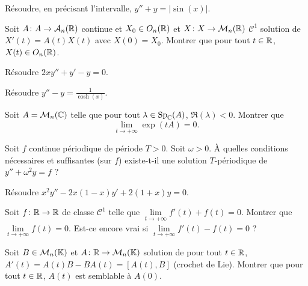 \documentclass[12pt]{article}
\begin{document}
\begin{exercise}
	Résoudre, en précisant l'intervalle, $y''+y=\left\lvert\sin(x)\right\rvert$.
\end{exercise}

\begin{exercise}
	Soit $A\colon A\to\mathcal{A}_n(\mathbb{R})$ continue et $X_0\in O_n(\mathbb{R})$ et $X\colon X\to\mathcal{M}_n(\mathbb{R})$ $\mathcal{C}^{1}$ solution de $X'(t)=A(t)X(t)$ avec $X(0)=X_0$. Montrer que pour tout $t\in\mathbb{R}$, $X(t)\in O_n(\mathbb{R})$.
\end{exercise}

\begin{exercise}
	Résoudre $2xy''+y'-y=0$.
\end{exercise}

\begin{exercise}
	Résoudre $y''-y=\frac{1}{\cosh(x)}$.
\end{exercise}

\begin{exercise}
	Soit $A=\mathcal{M}_n(\mathbb{C})$ telle que pour tout $\lambda\in\operatorname{Sp}_{\mathbb{C}}(A)$, $\Re(\lambda)<0$. Montrer que 
	\begin{equation}
		\lim\limits_{t\to+\infty}\exp(tA)=0.
	\end{equation}
\end{exercise}

\begin{exercise}
	Soit $f$ continue périodique de période $T>0$. Soit $\omega>0$. À quelles conditions nécessaires et suffisantes (sur $f$) existe-t-il une solution $T$-périodique de $y''+\omega^{2}y=f$ ?
\end{exercise}

\begin{exercise}
	Résoudre $x^{2}y''-2x(1-x)y'+2(1+x)y=0$.
\end{exercise}

\begin{exercise}
	Soit $f\colon\mathbb{R}\to\mathbb{R}$ de classe $\mathcal{C}^{1}$ telle que $\lim\limits_{t\to+\infty}f'(t)+f(t)=0$. Montrer que $\lim\limits_{t\to+\infty}f(t)=0$. Est-ce encore vrai si $\lim\limits_{t\to+\infty}f'(t)-f(t)=0$ ?
\end{exercise}

\begin{exercise}
	Soit $B\in\mathcal{M}_n(\mathbb{K})$ et $A\colon\mathbb{R}\to\mathcal{M}_n(\mathbb{K})$ solution de pour tout $t\in\mathbb{R}$, $A'(t)=A(t)B-BA(t)=[A(t),B]$ (crochet de Lie). Montrer que pour tout $t\in\mathbb{R}$, $A(t)$ est semblable à $A(0)$.
\end{exercise}
\end{document}
